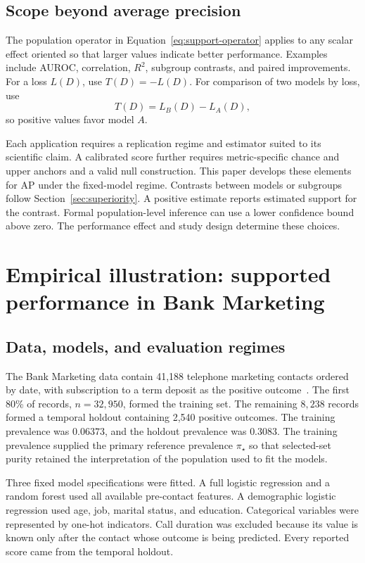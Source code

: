 \documentclass[11pt]{article}
\theoremstyle{remark}
\begin{document}
\subsection{Scope beyond average precision}

The population operator in Equation~\eqref{eq:support-operator} applies to any scalar effect oriented so that larger values indicate better performance. Examples include AUROC, correlation, $R^2$, subgroup contrasts, and paired improvements. For a loss $L(D)$, use $T(D)=-L(D)$. For comparison of two models by loss, use
\[
T(D)=L_B(D)-L_A(D),
\]
so positive values favor model $A$.

Each application requires a replication regime and estimator suited to its scientific claim. A calibrated score further requires metric-specific chance and upper anchors and a valid null construction. This paper develops these elements for AP under the fixed-model regime. Contrasts between models or subgroups follow Section~\ref{sec:superiority}. A positive estimate reports estimated support for the contrast. Formal population-level inference can use a lower confidence bound above zero. The performance effect and study design determine these choices.

\section{Empirical illustration: supported performance in Bank Marketing}
\label{sec:bank-marketing}

\subsection{Data, models, and evaluation regimes}

The Bank Marketing data contain 41,188 telephone marketing contacts ordered by date, with subscription to a term deposit as the positive outcome~\cite{moro2014bank}. The first 80\% of records, $n=32{,}950$, formed the training set. The remaining $8{,}238$ records formed a temporal holdout containing 2,540 positive outcomes. The training prevalence was $0.06373$, and the holdout prevalence was $0.3083$. The training prevalence supplied the primary reference prevalence $\pi_\star$ so that selected-set purity retained the interpretation of the population used to fit the models.

Three fixed model specifications were fitted. A full logistic regression and a random forest used all available pre-contact features. A demographic logistic regression used age, job, marital status, and education. Categorical variables were represented by one-hot indicators. Call duration was excluded because its value is known only after the contact whose outcome is being predicted. Every reported score came from the temporal holdout.
\end{document}
